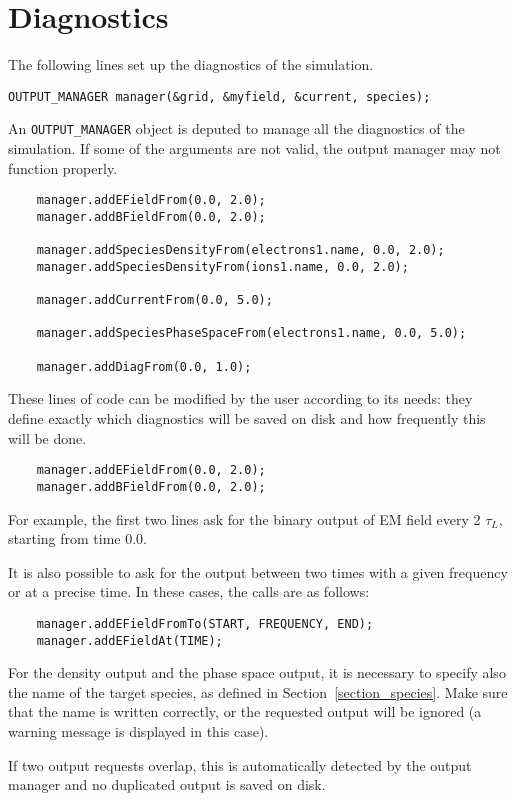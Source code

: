 \documentclass[11pt,a4paper]{report}
\begin{document}
\section{Diagnostics}
The following lines set up the diagnostics of the simulation.
\begin{lstlisting}[backgroundcolor=\color{no_modify}]
	OUTPUT_MANAGER manager(&grid, &myfield, &current, species);
\end{lstlisting}
An \verb+OUTPUT_MANAGER+ object is deputed to manage all the diagnostics of the simulation. If some of the arguments are not valid, the output manager may not function properly.
\begin{lstlisting}
	manager.addEFieldFrom(0.0, 2.0);
	manager.addBFieldFrom(0.0, 2.0);

	manager.addSpeciesDensityFrom(electrons1.name, 0.0, 2.0);
	manager.addSpeciesDensityFrom(ions1.name, 0.0, 2.0);

	manager.addCurrentFrom(0.0, 5.0);

	manager.addSpeciesPhaseSpaceFrom(electrons1.name, 0.0, 5.0);

	manager.addDiagFrom(0.0, 1.0);

\end{lstlisting}
These lines of code can be modified by the user according to its needs: they define exactly which diagnostics will be saved on disk and how frequently this will be done.
\begin{lstlisting}
	manager.addEFieldFrom(0.0, 2.0);
	manager.addBFieldFrom(0.0, 2.0);
\end{lstlisting}
For example, the first two lines ask for the binary output of EM field every 2 $\tau_L$, starting from time 0.0.

It is also possible to ask for the output between two times with a given frequency or at a precise time. In these cases, the calls are as follows:
\begin{lstlisting}
	manager.addEFieldFromTo(START, FREQUENCY, END);
	manager.addEFieldAt(TIME);
\end{lstlisting}
For the density output and the phase space output, it is necessary to specify also the name of the target species, as defined in Section~\ref{section_species}. Make sure that the name is written correctly, or the requested output will be ignored (a warning message is displayed in this case).

If two output requests overlap, this is automatically detected by the output manager and no duplicated output is saved on disk.
\end{document}
